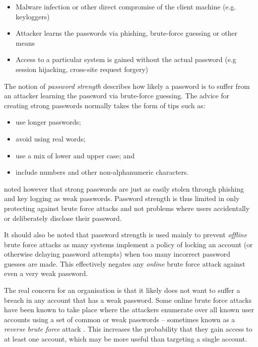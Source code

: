 \documentclass{report}
\begin{document}
\begin{itemize}
  \item Malware infection or other direct compromise of the client machine (e.g. keyloggers)
  \item Attacker learns the passwords via phishing, brute-force guessing or other means
  \item Access to a particular system is gained without the actual password (e.g session hijacking, cross-site request forgery)
\end{itemize}

The notion of \emph{password strength} describes how likely
a password is to suffer from an attacker learning the password via brute-force
guessing. The advice for creating strong passwords normally takes the form of tips
such as:

\begin{itemize}
  \item use longer passwords;
  \item avoid using real words;
  \item use a mix of lower and upper case; and
  \item include numbers and other non-alphanumeric characters.
\end{itemize}

\textcite{florencio2007large} noted however that strong passwords are just
as easily stolen through phishing and key logging as weak
passwords. Password strength is thus limited in only protecting against
brute force attacks and not problems where users accidentally
or deliberately disclose their password.

It should also be noted that password strength is
used mainly to prevent
\emph{offline} brute force attacks as many systems
implement a policy of locking an account (or otherwise
delaying password attempts) when too many incorrect
password guesses are made. This effectively negates any
\emph{online} brute force attack against even a very weak
password.

The real concern for an organisation
is that it likely does not want to suffer
a breach in any account that has a weak password. Some
online brute force attacks have been known to take place
where the attackers enumerate over all known user accounts
using a set of common or weak passwords -- sometimes known
as a \emph{reverse brute force} attack \parencite{khan2010comparative}.
This increases
the probability that they gain access to at least one
account, which may be more useful than targeting a single
account.
\end{document}
